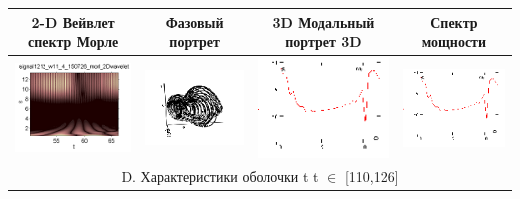 \documentclass[12pt,letterpaper]{extreport}
\begin{document}
\begin{table}[H]
{\begin{tabular}{|c|c|c|c|}
\hline
\footnotesize 2-D Вейвлет спектр Морле&\footnotesize Фазовый портрет&\footnotesize 3D	Модальный портрет 3D&\footnotesize Спектр мощности\\
\hline
	\includegraphics[scale=1]{c1} 	
	&	
	\includegraphics[scale=0.9]{c2} 	
	&	
	\includegraphics[scale=0.9]{c3} 
	&
	\includegraphics[scale=0.9]{c4} 
\\
\hline

\multicolumn{4}{|c|}{D. Характеристики оболочки t  t $\in$ [110,126]}\\


\end{tabular}}
\end{table}
\end{document}

